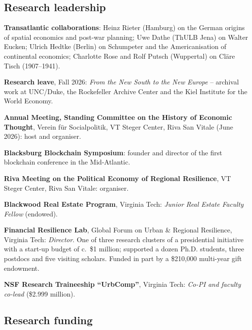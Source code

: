 \documentclass[letter,11pt]{article}
\newlength{\cvlabelw}
\newenvironment{cvlist}[1][2.5cm]{%
  \setlength{\cvlabelw}{#1}%
  \begin{list}{}{%
    \setlength{\leftmargin}{\cvlabelw}\setlength{\labelwidth}{\cvlabelw}%
    \setlength{\labelsep}{0pt}\setlength{\itemindent}{0pt}\setlength{\listparindent}{0pt}%
    \setlength{\itemsep}{4pt}\setlength{\parsep}{0pt}\setlength{\topsep}{3pt}\setlength{\partopsep}{0pt}%
    \renewcommand{\makelabel}[1]{##1\hfil}}}{\end{list}}
\begin{document}
\subsection*{Research leadership}
\begin{cvlist}
\item[ongoing] \textbf{Transatlantic collaborations}: Heinz Rieter (Hamburg) on the German origins of spatial economics and post-war planning; Uwe Dathe (ThULB Jena) on Walter Eucken; Ulrich Hedtke (Berlin) on Schumpeter and the Americanisation of continental economics; Charlotte Rose and Rolf Putsch (Wuppertal) on Cl\"{a}re Tisch (1907--1941).
\item[2026 -- 2027] \textbf{Research leave}, Fall 2026: \emph{From the New South to the New Europe} -- archival work at UNC/Duke, the Rockefeller Archive Center and the Kiel Institute for the World Economy.
\item[2026] \textbf{Annual Meeting, Standing Committee on the History of Economic Thought}, Verein f\"{u}r Socialpolitik, VT Steger Center, Riva San Vitale (June 2026): host and organiser.
\item[2018] \textbf{Blacksburg Blockchain Symposium}: founder and director of the first blockchain conference in the Mid-Atlantic.
\item[2018] \textbf{Riva Meeting on the Political Economy of Regional Resilience}, VT Steger Center, Riva San Vitale: organiser.
\item[2016 -- 2019] \textbf{Blackwood Real Estate Program}, Virginia Tech: \emph{Junior Real Estate Faculty Fellow} (endowed).
\item[2015 -- 2022] \textbf{Financial Resilience Lab}, Global Forum on Urban \& Regional Resilience, Virginia Tech: \emph{Director}. One of three research clusters of a presidential initiative with a start-up budget of c.\ \$1 million; supported a dozen Ph.D. students, three postdocs and five visiting scholars. Funded in part by a \$210,000 multi-year gift endowment.
\item[2015 -- 2021] \textbf{NSF Research Traineeship \enquote{UrbComp}}, Virginia Tech: \emph{Co-PI and faculty co-lead} (\$2.999 million).
\end{cvlist}

\subsection*{Research funding}
\end{document}
